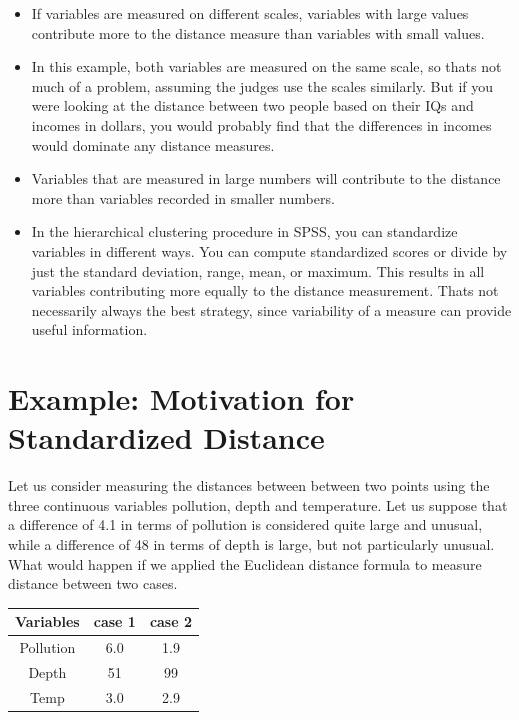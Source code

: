 \documentclass[a4paper,12pt]{report}
\begin{document}
\begin{itemize}
	\item If variables are measured on different scales, variables with large values contribute
	more to the distance measure than variables with small values. 
	\item In this example, both
	variables are measured on the same scale, so thats not much of a problem, assuming
	the judges use the scales similarly. But if you were looking at the distance between two
	people based on their IQs and incomes in dollars, you would probably find that the
	differences in incomes would dominate any distance measures.
	
	
	\item Variables that are measured in large numbers will contribute to the distance more than variables recorded in smaller
	numbers.
	
	\item In the hierarchical clustering procedure in SPSS, you can standardize variables in
	different ways. You can compute standardized scores or divide by just the standard
	deviation, range, mean, or maximum. This results in all variables contributing more
	equally to the distance measurement. Thats not necessarily always the best strategy,
	since variability of a measure can provide useful information. 
	
\end{itemize}
\newpage


\section{Example: Motivation for Standardized Distance}

Let us consider measuring the distances between between two points using
the three continuous variables pollution, depth and temperature. Let us suppose that a difference of 4.1 in terms of pollution is considered quite large and unusual, while a difference of 48 in terms of depth is large, but not particularly unusual.
What would happen if we applied the Euclidean distance formula to measure distance between two cases.
\begin{center}
	\begin{tabular}{|c|c|c|}
		\hline
		Variables & case 1 & case 2 \\ \hline 
		Pollution & 6.0 & 1.9 \\
		Depth & 51 & 99 \\
		Temp & 3.0 & 2.9 \\
		\hline
	\end{tabular}
\end{center}
\end{document}
